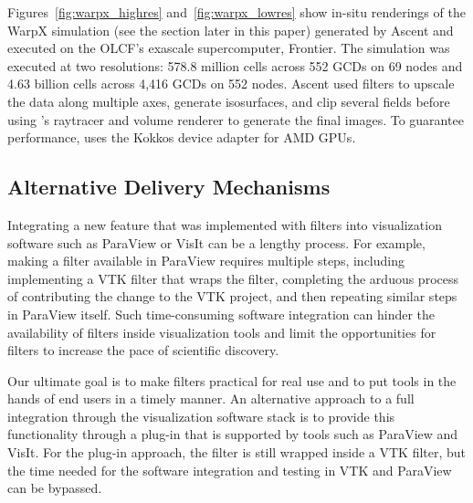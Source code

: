 Figures~\ref{fig:warpx_highres} and~\ref{fig:warpx_lowres} show in-situ renderings of the WarpX simulation (see the  section later in this paper) generated by Ascent and executed on the OLCF's exascale supercomputer, Frontier.
The simulation was executed at two resolutions: 578.8 million cells across 552 GCDs on 69 nodes and 4.63 billion cells across 4,416 GCDs on 552 nodes.
Ascent used \vtkm filters to upscale the data along multiple axes, generate isosurfaces, and clip several fields before using \vtkm's raytracer and volume renderer to generate the final images.
To guarantee performance, \vtkm uses the Kokkos device adapter for AMD GPUs. 


\subsection{Alternative Delivery Mechanisms}


Integrating a new feature that was implemented with \vtkm filters into visualization software such as ParaView or VisIt can be a lengthy process.
For example, making a \vtkm filter available in ParaView requires multiple steps, including implementing a VTK filter that wraps the \vtkm filter, completing the arduous process of contributing the change to the VTK project, and then repeating similar steps in ParaView itself.
Such time-consuming software integration can hinder the availability of \vtkm filters inside visualization tools and limit the opportunities for \vtkm filters to increase the pace of scientific discovery.

Our ultimate goal is to make \vtkm filters practical for real use and to put tools in the hands of end users in a timely manner.
An alternative approach to a full integration through the visualization software stack is to provide this functionality through a plug-in that is supported by tools such as ParaView and VisIt.
For the plug-in approach, the \vtkm filter is still wrapped inside a VTK filter, but the time needed for the software integration and testing in VTK and ParaView can be bypassed.

